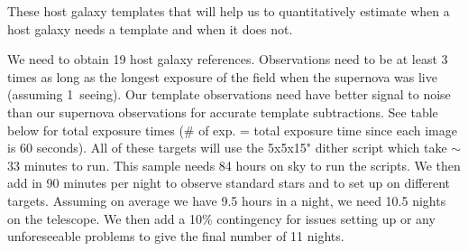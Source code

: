 \documentclass[11pt]{article}
\begin{document}

%



%

\technicaldescription

These host galaxy templates that will help us to quantitatively estimate when a host galaxy needs a template and when it does not.

We need to obtain 19 host galaxy references. 
Observations need to be at least 3 times as long as the longest exposure of the field when the supernova was live (assuming 1\arcsec\ seeing).
Our template observations need have better signal to noise than our supernova observations for accurate template subtractions. 
See table below for total exposure times ($\#$ of exp. = total exposure time since each image is 60 seconds).
All of these targets will use the 5x5x15" dither script which take $\sim$ 33 minutes to run.
This sample needs 84 hours on sky to run the scripts. 
We then add in 90 minutes per night to observe standard stars and to set up on different targets. 
Assuming on average we have 9.5 hours in a night, we need 10.5 nights on the telescope. 
We then add a 10$\%$ contingency for issues setting up or any unforeseeable problems to give the final number of 11 nights. 
\end{document}
